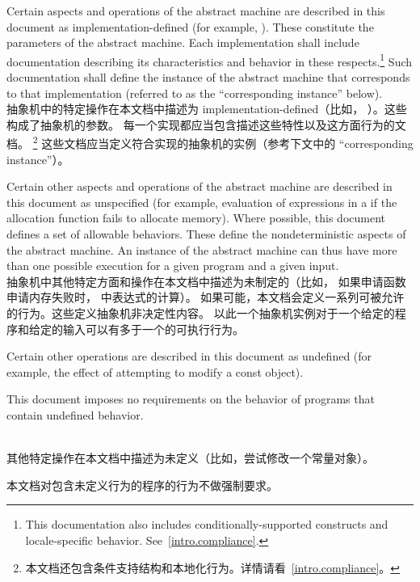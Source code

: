 %
\pnum
Certain aspects and operations of the abstract machine are described in this
document as implementation-defined (for example,
). These constitute the parameters of the abstract machine.
Each implementation shall include documentation describing its characteristics
and behavior in these respects.\footnote{This documentation also includes
conditionally-supported constructs and locale-specific behavior.
See~\ref{intro.compliance}.} Such documentation shall define the instance of the
abstract machine that corresponds to that implementation (referred to as the
``corresponding instance'' below). \\
抽象机中的特定操作在本文档中描述为 implementation-defined（比如，
）。这些构成了抽象机的参数。
每一个实现都应当包含描述这些特性以及这方面行为的文档。
\footnote{本文档还包含条件支持结构和本地化行为。详情请看~\ref{intro.compliance}。}
这些文档应当定义符合实现的抽象机的实例（参考下文中的 ``corresponding instance''）。

%
\pnum
Certain other aspects and operations of the abstract machine are
described in this document as unspecified (for example,
evaluation of expressions in a  if the allocation
function fails to allocate memory). Where possible, this
document defines a set of allowable behaviors. These
define the nondeterministic aspects of the abstract machine. An instance
of the abstract machine can thus have more than one possible execution
for a given program and a given input. \\
抽象机中其他特定方面和操作在本文档中描述为未制定的（比如，
如果申请函数申请内存失败时， 中表达式的计算）。
如果可能，本文档会定义一系列可被允许的行为。这些定义抽象机非决定性内容。
以此一个抽象机实例对于一个给定的程序和给定的输入可以有多于一个的可执行行为。

%
\pnum
Certain other operations are described in this document as
undefined (for example, the effect of
attempting to modify a const object).
\begin{note} This document imposes no requirements on the
behavior of programs that contain undefined behavior. \end{note} \\
其他特定操作在本文档中描述为未定义（比如，尝试修改一个常量对象）。
\begin{note} 本文档对包含未定义行为的程序的行为不做强制要求。\end{note}

